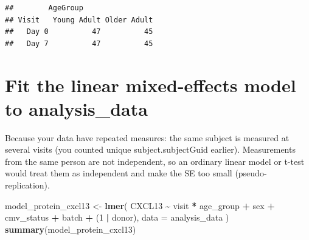 \documentclass[
]{article}
\newenvironment{Shaded}{\begin{snugshade}}{\end{snugshade}}
\newcommand{\AttributeTok}[1]{\textcolor[rgb]{0.13,0.29,0.53}{#1}}
\newcommand{\DecValTok}[1]{\textcolor[rgb]{0.00,0.00,0.81}{#1}}
\newcommand{\FunctionTok}[1]{\textcolor[rgb]{0.13,0.29,0.53}{\textbf{#1}}}
\newcommand{\NormalTok}[1]{#1}
\newcommand{\OtherTok}[1]{\textcolor[rgb]{0.56,0.35,0.01}{#1}}
\newcommand{\SpecialCharTok}[1]{\textcolor[rgb]{0.81,0.36,0.00}{\textbf{#1}}}
\begin{document}
\begin{verbatim}
##        AgeGroup
## Visit   Young Adult Older Adult
##   Day 0          47          45
##   Day 7          47          45
\end{verbatim}

\section{Fit the linear mixed-effects model to
analysis\_data}\label{fit-the-linear-mixed-effects-model-to-analysis_data}

Because your data have repeated measures: the same subject is measured
at several visits (you counted unique subject.subjectGuid earlier).
Measurements from the same person are not independent, so an ordinary
linear model or t-test would treat them as independent and make the SE
too small (pseudo-replication).

\begin{Shaded}
\begin{Highlighting}[]
\NormalTok{model\_protein\_cxcl13 }\OtherTok{\textless{}{-}} \FunctionTok{lmer}\NormalTok{(}
\NormalTok{  CXCL13 }\SpecialCharTok{\textasciitilde{}}\NormalTok{ visit }\SpecialCharTok{*}\NormalTok{ age\_group }\SpecialCharTok{+}\NormalTok{ sex }\SpecialCharTok{+}\NormalTok{ cmv\_status }\SpecialCharTok{+}\NormalTok{ batch }\SpecialCharTok{+}\NormalTok{ (}\DecValTok{1} \SpecialCharTok{|}\NormalTok{ donor),}
  \AttributeTok{data =}\NormalTok{ analysis\_data}
\NormalTok{)}
\FunctionTok{summary}\NormalTok{(model\_protein\_cxcl13)}
\end{Highlighting}
\end{Shaded}
\end{document}

